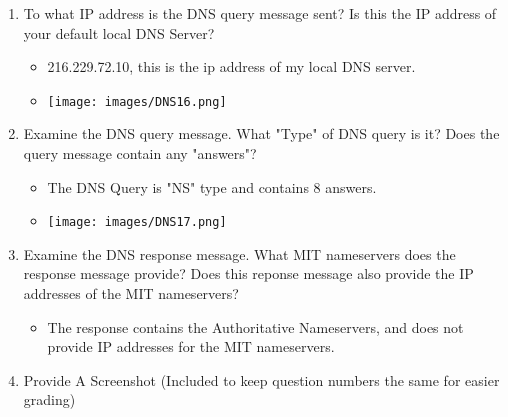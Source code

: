 \documentclass{article}
\begin{document}
\begin{itemize}
\begin{enumerate}
      \item To what IP address is the DNS query message sent? Is this the IP address of your default local DNS Server?
      \begin{itemize}
        \item 216.229.72.10, this is the ip address of my local DNS server.
        \item \texttt{[image: images/DNS16.png]}
      \end{itemize}
      \item Examine the DNS query message.  What "Type" of DNS query is it?  Does the query message contain any "answers"?
      \begin{itemize}
        \item The DNS Query is "NS" type and contains 8 answers.
        \item \texttt{[image: images/DNS17.png]}
      \end{itemize}
      \item Examine the DNS response message.  What MIT nameservers does the response message provide?  Does this reponse message also provide the IP addresses of the MIT nameservers?
      \begin{itemize}
        \item The response contains the Authoritative Nameservers, and does not provide IP addresses for the MIT nameservers.
        
      \end{itemize}
      \item Provide A Screenshot (Included to keep question numbers the same for easier grading)
      

\end{enumerate}
\end{itemize}
\end{document}
